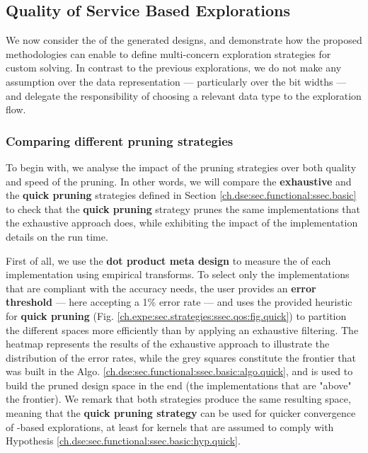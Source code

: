     \subsection{Quality of Service Based Explorations}
    \label{ch.expe:sec.strategies:ssec.qos}

        We now consider the  of the generated designs, and demonstrate how the proposed methodologies can enable to define multi-concern exploration strategies for custom  solving.
        In contrast to the previous explorations, we do not make any assumption over the data representation --- particularly over the bit widths --- and delegate the responsibility of choosing a relevant data type to the exploration flow.

        \subsubsection{Comparing different pruning strategies}

            To begin with, we analyse the impact of the pruning strategies over both quality and speed of the pruning.
            In other words, we will compare the {\bf exhaustive} and the {\bf quick pruning} strategies defined in Section \ref{ch.dse:sec.functional:ssec.basic} to check that the {\bf quick pruning} strategy prunes the same implementations that the exhaustive approach does, while exhibiting the impact of the implementation details on the run time.

            First of all, we use the {\bf dot product meta design} to measure the  of each implementation using empirical transforms.
            To select only the implementations that are compliant with the accuracy needs, the user provides an {\bf error threshold} --- here accepting a 1\% error rate --- and uses the provided heuristic for {\bf quick pruning} (Fig. \ref{ch.expe:sec.strategies:ssec.qos:fig.quick}) to partition the different spaces more efficiently than by applying an exhaustive filtering.
            The heatmap represents the results of the exhaustive approach to illustrate the distribution of the error rates, while the grey squares constitute the frontier that was built in the Algo. \ref{ch.dse:sec.functional:ssec.basic:algo.quick}, and is used to build the pruned design space in the end (\ie the implementations that are "above" the frontier).
            We remark that both strategies produce the same resulting space, meaning that the {\bf quick pruning strategy} can be used for quicker convergence of -based explorations, at least for kernels that are assumed to comply with Hypothesis \ref{ch.dse:sec.functional:ssec.basic:hyp.quick}.


